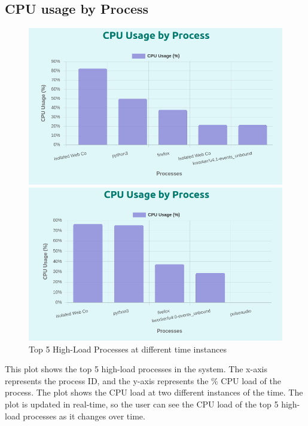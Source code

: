 \documentclass[12pt]{article}
\begin{document}
\subsection{CPU usage by Process}
\begin{figure}[H]
    \centering
    \begin{minipage}{0.45\textwidth}
        \centering
        \includegraphics[width=\textwidth]{logos and images/PLOT1_1.png}
    \end{minipage}
    \hfill
    \begin{minipage}{0.45\textwidth}
        \centering
        \includegraphics[width=\textwidth]{logos and images/PLOT1_2.png}
    \end{minipage}
    \caption{Top 5 High-Load Processes at different time instances}
\end{figure}
This plot shows the top 5 high-load processes in the system. The x-axis represents the process ID, and the y-axis represents the \% CPU load of the process. The plot shows the CPU load at two different instances of the time. The plot is updated in real-time, so the user can see the CPU load of the top 5 high-load processes as it changes over time.
\end{document}
